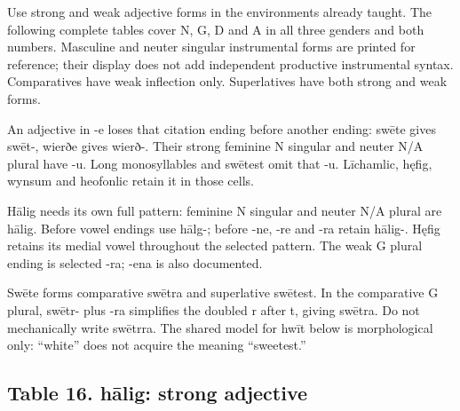 Use strong and weak adjective forms in the environments already taught. The following complete tables cover N, G, D and A in all three genders and both numbers. Masculine and neuter singular instrumental forms are printed for reference; their display does not add independent productive instrumental syntax. Comparatives have weak inflection only. Superlatives have both strong and weak forms.

An adjective in -e loses that citation ending before another ending: swēte gives swēt-, wierðe gives wierð-. Their strong feminine N singular and neuter N/\allowbreak{}A plural have -u. Long monosyllables and swētest omit that -u. Līchamlic, hęfig, wynsum and heofonlic retain it in those cells.

Hālig needs its own full pattern: feminine N singular and neuter N/\allowbreak{}A plural are hālig. Before vowel endings use hālg-; before -ne, -re and -ra retain hālig-. Hęfig retains its medial vowel throughout the selected pattern. The weak G plural ending is selected -ra; -ena is also documented.

Swēte forms comparative swētra and superlative swētest. In the comparative G plural, swētr- plus -ra simplifies the doubled r after t, giving swētra. Do not mechanically write swētrra. The shared model for hwīt below is morphological only: “white” does not acquire the meaning “sweetest.”

\subsection*{Table 16. hālig: strong adjective}

